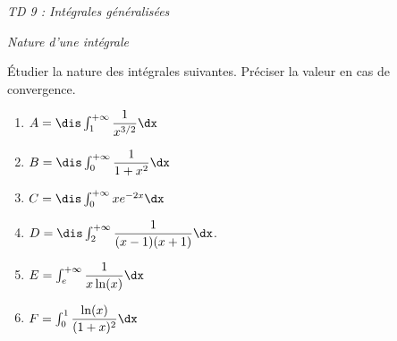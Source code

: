 \documentclass[a4paper,10pt]{report}
\begin{document}
\everymath{\displaystyle}
\begin{center}
\textit{{ {\huge TD 9 : Intégrales généralisées}}}
\end{center}


\bigskip

\begin{center}
\textit{{ {\large Nature d'une intégrale}}}
\end{center}

\medskip

\begin{Exercice}{} Étudier la nature des intégrales suivantes. Préciser la valeur en cas de convergence.

\begin{multicols}{2}
\begin{enumerate}
\item $A = \dis \int_1^{+ \infty} \dfrac{1}{x^{3/2}} \dx$
\item $B = \dis \int_0^{+ \infty} \dfrac{1}{1+x^2} \dx$
\item $C = \dis \int_0^{+ \infty} x e^{-2x} \dx$
\item $D= \dis \int_2^{+ \infty} \dfrac{1}{(x-1)(x+1)} \dx$.
\item $E= \int_{e}^{+ \infty} \dfrac{1}{x\ln(x)} \dx$
\item $F= \int_0^1 \dfrac{\ln(x)}{(1+x)^2} \dx$
\end{enumerate}
\end{multicols}
\vspace{0.1cm}
\end{Exercice}

\corr 
\end{document}

